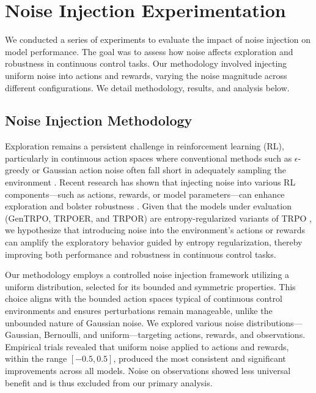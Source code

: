 \documentclass{svproc}
\begin{document}

\section{Noise Injection Experimentation}
We conducted a series of experiments to evaluate the impact of noise injection on model performance. The goal was to assess how noise affects exploration and robustness in continuous control tasks. Our methodology involved injecting uniform noise into actions and rewards, varying the noise magnitude across different configurations. We detail methodology, results, and analysis below.

\subsection{Noise Injection Methodology}

Exploration remains a persistent challenge in reinforcement learning (RL), particularly in continuous action spaces where conventional methods such as $\epsilon$-greedy or Gaussian action noise often fall short in adequately sampling the environment \cite{plappert2018parameterspacenoiseexploration}. Recent research has shown that injecting noise into various RL components—such as actions, rewards, or model parameters—can enhance exploration and bolster robustness \cite{plappert2018parameterspacenoiseexploration, wang2020reinforcementlearningperturbedrewards}. Given that the models under evaluation (GenTRPO, TRPOER, and TRPOR) are entropy-regularized variants of TRPO \cite{schulman2017trustregionpolicyoptimization}, we hypothesize that introducing noise into the environment’s actions or rewards can amplify the exploratory behavior guided by entropy regularization, thereby improving both performance and robustness in continuous control tasks.

Our methodology employs a controlled noise injection framework utilizing a uniform distribution, selected for its bounded and symmetric properties. This choice aligns with the bounded action spaces typical of continuous control environments and ensures perturbations remain manageable, unlike the unbounded nature of Gaussian noise. We explored various noise distributions—Gaussian, Bernoulli, and uniform—targeting actions, rewards, and observations. Empirical trials revealed that uniform noise applied to actions and rewards, within the range $[-0.5, 0.5]$, produced the most consistent and significant improvements across all models. Noise on observations showed less universal benefit and is thus excluded from our primary analysis.
\end{document}
